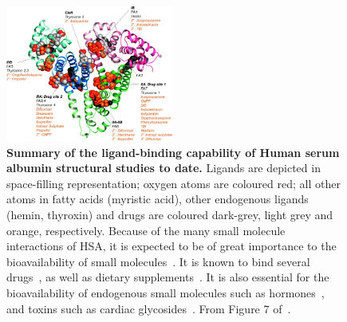 \documentclass[10pt,final]{article}
\begin{document}
\begin{figure}[H]
	\centering	
	\includegraphics[width=0.49\textwidth]{figures/hsa_fig7_ghuman2005.jpg}
	\caption{\textbf{Summary of the ligand-binding capability of Human serum albumin structural studies to date.} Ligands are depicted in space-filling representation; oxygen atoms are coloured red; all other atoms in fatty acids (myristic acid), other endogenous ligands (hemin, thyroxin) and drugs are coloured dark-grey, light grey and orange, respectively. Because of the many small molecule interactions of HSA, it is expected to be of great importance to the bioavailability of small molecules~\autocite{Metcalfe2010a}. It is known to bind several drugs~\autocite{SJOeHOLM1979a,Bannwarth1996a,Sulkowska2002a,Ghuman2005a,Perez2007a}, as well as dietary supplements~\autocite{Pal2013a}. It is also essential for the bioavailability of endogenous small molecules such as hormones~\autocite{Pardridge1986a}, and toxins such as cardiac glycosides~\autocite{Smith1985a}. From Figure 7 of~\autocite{Ghuman2005a}.
}
	\label{figure:albumin}
\end{figure} 


\end{document}

